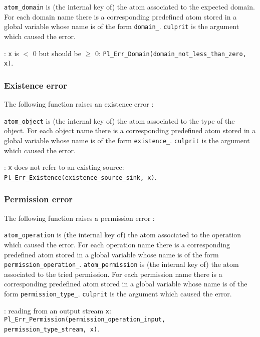 \texttt{atom\_domain} is (the internal key of) the atom associated to the
expected domain. For each domain name  there is a
corresponding predefined atom stored in a global variable whose name is of
the form \texttt{domain\_}. \texttt{culprit} is the argument which
caused the error.

: \texttt{x} is $<$ 0 but should be $\geq$ 0:
\texttt{Pl\_Err\_Domain(domain\_not\_less\_than\_zero, x)}.

\subsubsection{Existence error}
The following function raises an existence error :


\texttt{atom\_object} is (the internal key of) the atom associated to the
type of the object. For each object name  there is a
corresponding predefined atom stored in a global variable whose name is of
the form \texttt{existence\_}. \texttt{culprit} is the argument
which caused the error.

: \texttt{x} does not refer to an existing source:
\texttt{Pl\_Err\_Existence(existence\_source\_sink, x)}.

\subsubsection{Permission error}
The following function raises a permission error :


\texttt{atom\_operation} is (the internal key of) the atom associated to the
operation which caused the error. For each operation name
 there is a corresponding predefined atom stored in a
global variable whose name is of the form
\texttt{permission\_operation\_}. \texttt{atom\_permission} is
(the internal key of) the atom associated to the tried permission. For each
permission name  there is a corresponding predefined atom
stored in a global variable whose name is of the form
\texttt{permission\_type\_}. \texttt{culprit} is the argument
which caused the error.

: reading from an output stream \texttt{x}:
\texttt{Pl\_Err\_Permission(permission\_operation\_input, \\
permission\_type\_stream, x)}.

